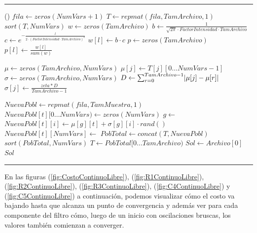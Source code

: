 \documentclass{llncs}
\makeatletter
\newenvironment{breakablealgorithm}
{%
	\begin{center}
		\refstepcounter{algorithm}%
		\hrule height.8pt depth0pt \kern2pt%
		\renewcommand{\caption}[2][\relax]{%
			{\raggedright\textbf{\ALG@name~\thealgorithm} ##2\par}%
			\ifx\relax##1\relax %
			\addcontentsline{loa}{algorithm}{\protect\numberline{\thealgorithm}##2}%
			\else %
			\addcontentsline{loa}{algorithm}{\protect\numberline{\thealgorithm}##1}%
			\fi
			\kern2pt\hrule\kern2pt
		}
	}{%
		\kern2pt\hrule\relax%
	\end{center}
}
\DeclarePairedDelimiter\abs{\lvert}{\rvert}
\makeatother
\begin{document}
\begin{breakablealgorithm}
\begin{algorithmic}[1]
			()
			\State $fila \gets zeros(NumVars+1)$
			\State $T \gets repmat(fila, TamArchivo, 1)$
			\State {}
			\State $sort(T, NumVars)$
			\State $w \gets zeros(TamArchivo)$ 
			\State $b \gets  \frac{1}{\sqrt{2\pi} \cdot FactorIntensidad \cdot TamArchivo}$
			\State $c \gets e^{-\frac{l}{2 \cdot (FactorIntensidad \cdot TamArchivo)^2}}$
			\State $w[l] \gets b \cdot c $ 
			\EndFor
			\State $p \gets zeros(TamArchivo)$ 
			\State $p[l] \gets \frac{w[l]}{sum(w)}$
			\EndFor
			\item[]
			 
			\State $\mu \gets zeros(TamArchivo, NumVars)$ 
			\State $\mu[j] \gets T[j][0 \dots NumVars - 1]$
			\EndFor
			\State $\sigma \gets zeros(TamArchivo, NumVars)$ 
			\State $D \gets \sum_{r=0}^{TamArchivo - 1}\abs{\mu[j]-\mu[r]}$
			\State $\sigma[j] \gets \frac{zeta * D}{TamArchivo -1}$
			\EndFor
			\item[]
			\State $NuevaPobl \gets repmat(fila, TamMuestra, 1)$
			\State $NuevaPobl[t]\lbrack 0 \dots NumVars \rparen \gets zeros(NumVars)$
			\State $g \gets$  
			\State $NuevaPobl[t][i] \gets \mu[g][t] + \sigma[g][i] \cdot rand()$
			\EndFor
			\State $NuevaPobl[t][NumVars] \gets$ 
			\EndFor
			\State $PobTotal \gets concat(T, NuevaPobl)$
			\State $sort(PobTotal, NumVars)$
			\State $T \gets PobTotal \lbrack 0 \dots TamArchivo \rparen$ 
			\EndFor
			\State $Sol \gets Archivo[0]$
			\State \Return $Sol$
			\EndFunction
		\end{algorithmic}
	\end{breakablealgorithm}

	En las figuras (\ref{fig:CostoContinuoLibre}), (\ref{fig:R1ContinuoLibre}), (\ref{fig:R2ContinuoLibre}), (\ref{fig:R3ContinuoLibre}),
	(\ref{fig:C4ContinuoLibre}) y (\ref{fig:C5ContinuoLibre}) a continuación, 
	podemos visualizar cómo el costo va bajando hasta que alcanza un punto de convergencia y además ver
	para cada componente del filtro cómo, luego de un inicio con oscilaciones bruscas, los valores también comienzan a converger.
	
\end{document}
